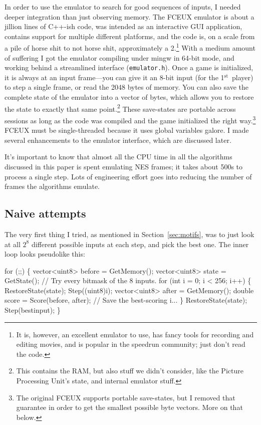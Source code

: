 \documentclass[twocolumn]{article}
\newcommand\st{$^{\mathrm{st}}$}
\begin{document}
In order to use the emulator to search for good sequences of inputs, I
needed deeper integration than just observing memory. The FCEUX
emulator is about a jillion lines of C++-ish code, was intended as an
interactive GUI application, contains support for multiple different
platforms, and the code is, on a scale from a pile of horse shit to
not horse shit, approximately a 2.\footnote{It is, however, an
  excellent emulator to use, has fancy tools for recording and editing
  movies, and is popular in the speedrun community; just don't read
  the code.} With a medium amount of suffering I got the emulator
compiling under mingw in 64-bit mode, and working behind a streamlined
interface ({\tt emulator.h}). Once a game is initialized, it is always
at an input frame---you can give it an 8-bit input (for the
1\st\ player) to step a single frame, or read the 2048 bytes of
memory. You can also save the complete state of the emulator into a
vector of bytes, which allows you to restore the state to exactly that
same point.\footnote{This contains the RAM, but also stuff we didn't
  consider, like the Picture Processing Unit's state, and internal
  emulator stuff.} These save-states are portable across sessions as
long as the code was compiled and the game initialized the right
way.\footnote{The original FCEUX supports portable save-states, but I
  removed that guarantee in order to get the smallest possible byte
  vectors. More on that below.} FCEUX must be single-threaded because
it uses global variables galore. I made several enhancements to the
emulator interface, which are discussed later. 

It's important to know that almost all the CPU time in all the
algorithms discussed in this paper is spent emulating NES frames; it
takes about 500\textmu s to process a single step. Lots of
engineering effort goes into reducing the number of frames the
algorithms emulate.

\subsection{Naive attempts}

The very first thing I tried, as mentioned in
Section~\ref{sec:motifs}, was to just look at all $2^8$ different
possible inputs at each step, and pick the best one. The inner
loop looks pseudolike this:

\begin{code}
  for (;;) \{
    vector<uint8> before = GetMemory();
    vector<uint8> state = GetState();
    // Try every bitmask of the 8 inputs.
    for (int i = 0; i < 256; i++) \{
      RestoreState(state);
      Step((uint8)i);
      vector<uint8> after = GetMemory();
      double score = Score(before, after);
      // Save the best-scoring i...
    \}
    RestoreState(state);
    Step(bestinput);
  \}
\end{code}
\end{document}
